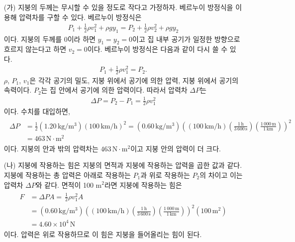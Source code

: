 \documentclass[floatfix,nofootinbib,superscriptaddress,fleqn]{revtex4-2}
\begin{document}
 \begin{itemize}
  \item[(가)] 
  지붕의 두께는 무시할 수 있을 정도로 작다고 가정하자.
  베르누이 방정식을 이용해 압력차를 구할 수 있다. 베르누이 방정식은
  \begin{align}
    P_1+\frac{1}{2}\rho v_1^2 +\rho gy_1
    =P_2+\frac{1}{2}\rho v_2^2 +\rho gy_2 
  \end{align}
  이다. 지붕의 두께를 $0$이라 하면 $y_1=y_2=0$이고 집 내부 공기가 
  일정한 방향으로 흐르지 않는다고 하면 $v_2=0$이다. 베르누이 방정식은
  다음과 같이 다시 쓸 수 있다.
  \begin{align}
    P_1+\frac{1}{2}\rho v_1^2
    =P_2.
  \end{align}
  $\rho$, $P_1$, $v_1$은 각각 공기의 밀도, 지붕 위에서 공기에 의한 압력,
  지붕 위에서 공기의 속력이다. $P_2$는 집 안에서 공기에 의한 압력이다. 따라서
  압력차 $\Delta P$는
  \begin{align}
    \Delta P = P_2 - P_1 = \frac{1}{2}\rho v_1^2
  \end{align}
  이다. 수치를 대입하면,
  \begin{align}
    \begin{split}
      \Delta P &= \frac{1}{2}(1.20\,\mathrm{kg/m^3}) (100\,\mathrm{km/h})^2
      = (0.60\,\mathrm{kg/m^3})
      \left(
        (100\,\mathrm{km/h})
        \left(\frac{1\,\mathrm{h}}{3\,600\,\mathrm{s}}\right) 
        \left(\frac{1\,000\,\mathrm{m}}{1\,\mathrm{km}}\right)
        \right)^2 \\
        &= 463\,\mathrm{N\cdot m^2}
      \end{split}
  \end{align}
  이다. 지붕의 안과 밖의 압력차는 $463\,\mathrm{N\cdot m^2}$이고 지붕 안의 압력이
  더 크다.
  \item[(나)] 
  지붕에 작용하는 힘은 지붕의 면적과 지붕에 작용하는 압력을 곱한 값과 같다. 
  지붕에 작용하는 총 압력은 아래로 작용하는 $P_1$과 위로 작용하는 $P_2$의 차이고
  이는 압력차 $\Delta P$와 같다.
  면적이 100 $\mathrm{m^2}$라면 지붕에 작용하는 힘은
  \begin{align}
    \begin{split}
      F &= \Delta P A = \frac{}{} \frac{1}{2}\rho v_1^2 A \\
      &= (0.60\,\mathrm{kg/m^3})
      \left(
        (100\,\mathrm{km/h})
        \left(\frac{1\,\mathrm{h}}{3\,600\,\mathrm{s}}\right) 
        \left(\frac{1\,000\,\mathrm{m}}{1\,\mathrm{km}}\right)
        \right)^2(100\,\mathrm{m^2})  \\
        &= 4.60\times 10^4\,\mathrm{N}
    \end{split}
  \end{align}
  이다. 압력은 위로 작용하므로 이 힘은 지붕을 들어올리는 힘이 된다.
 \end{itemize}
\end{document}
